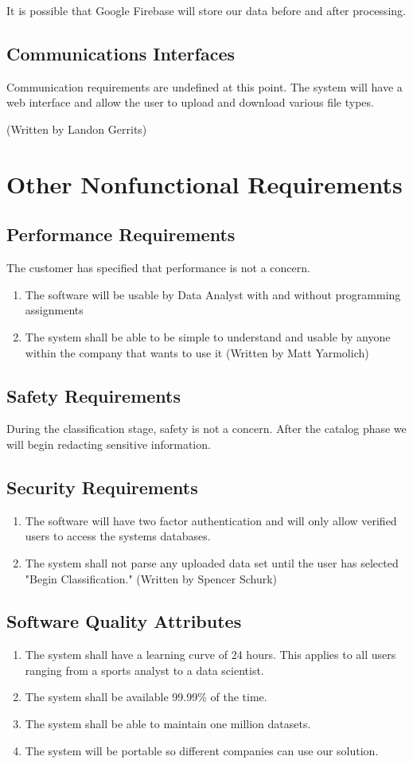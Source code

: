\documentclass[12pt,oneside,letterpaper]{article}
\begin{document}
It is possible that Google Firebase will store our data before and after processing.
\subsection{Communications Interfaces}
Communication requirements are undefined at this point. The system will have a web interface and allow the user to upload and download various file types. 

\item (Written by Landon Gerrits)


\section{Other Nonfunctional Requirements}
\subsection{Performance Requirements}
The customer has specified that performance is not a concern.
\begin{enumerate}
    \item The software will be usable by Data Analyst with and without programming assignments
    \item The system shall be able to be simple to understand and usable by anyone within the company that wants to use it (Written by Matt Yarmolich)
\end{enumerate}
\subsection{Safety Requirements}
During the classification stage, safety is not a concern. After the catalog phase we will begin redacting sensitive information.
\subsection{Security Requirements}
\begin{enumerate}
    \item The software will have two factor authentication and will only allow verified users to access the systems databases.
    \item The system shall not parse any uploaded data set until the user has selected "Begin Classification." (Written by Spencer Schurk)
\end{enumerate}
\subsection{Software Quality Attributes}
\begin{enumerate}
    \item The system shall have a learning curve of 24 hours. This applies to all users ranging from a sports analyst to a data scientist.
    \item The system shall be available 99.99\% of the time.
    \item The system shall be able to maintain one million datasets.
    \item The system will be portable so different companies can use our solution.
\end{enumerate}
\end{document}
